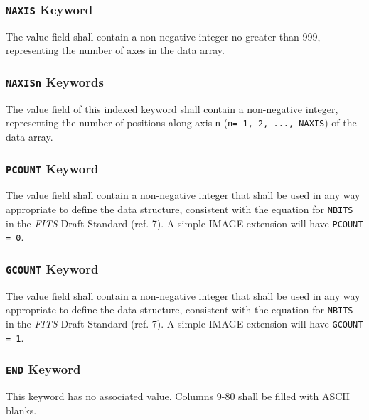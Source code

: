 \subsubsection{{\tt NAXIS} Keyword}
The value field shall contain a non-negative integer no greater than 999,
representing the number of axes in the data array.

\subsubsection{{\tt NAXISn} Keywords}
The value field of this indexed keyword shall contain a non-negative 
integer, representing the number of positions along axis {\tt n}
({\tt n= 1, 2, ..., NAXIS}) of the data array. 

\subsubsection{{\tt PCOUNT} Keyword}
The value field shall contain a non-negative integer that shall be used 
in any way appropriate to define the data structure, consistent with the 
equation for {\tt NBITS} in the {\sl FITS} Draft Standard (ref. 7).
A simple  IMAGE extension will have {\tt PCOUNT = 0}.

\subsubsection{{\tt GCOUNT} Keyword}
The value field shall contain a non-negative integer that shall be used 
in any way appropriate to define the data structure, consistent with the 
equation for {\tt NBITS} in the {\sl FITS} Draft Standard (ref. 7).
A simple IMAGE extension will have {\tt GCOUNT  = 1}.

\subsubsection{{\tt END} Keyword}
This keyword has no associated value. Columns 9-80 shall be filled with ASCII
blanks.

